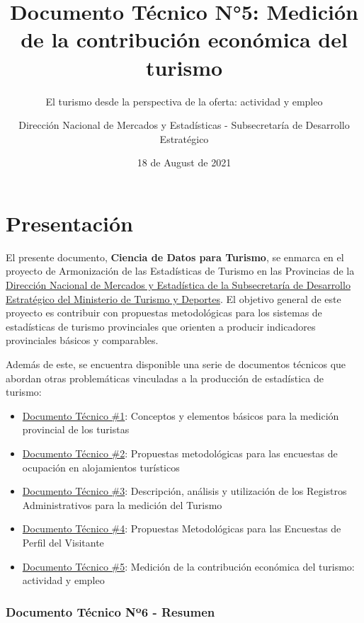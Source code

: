 \documentclass[
  openany]{book}
\title{Documento Técnico N°5: Medición de la contribución económica del turismo}
\subtitle{El turismo desde la perspectiva de la oferta: actividad y empleo}
\author{Dirección Nacional de Mercados y Estadísticas - Subsecretaría de Desarrollo Estratégico}
\date{18 de August de 2021}
\let\oldmaketitle\maketitle
\begin{document}
\maketitle


\newpage

\let\maketitle\oldmaketitle
\maketitle

{
\setcounter{tocdepth}{1}
\tableofcontents
}
\hypertarget{presentaciuxf3n}{%
\chapter*{Presentación}\label{presentaciuxf3n}}

El presente documento, \textbf{Ciencia de Datos para Turismo}, se enmarca en el proyecto de Armonización de las Estadísticas de Turismo en las Provincias de la \href{https://www.yvera.tur.ar/estadistica/}{Dirección Nacional de Mercados y Estadística de la Subsecretaría de Desarrollo Estratégico del Ministerio de Turismo y Deportes}. El objetivo general de este proyecto es contribuir con propuestas metodológicas para los sistemas de estadísticas de turismo provinciales que orienten a producir indicadores provinciales básicos y comparables.

Además de este, se encuentra disponible una serie de documentos técnicos que abordan otras problemáticas vinculadas a la producción de estadística de turismo:

\begin{itemize}
\item
  \href{https://dnme-minturdep.github.io/DT1_medicion_turismo/}{Documento Técnico \#1}: Conceptos y elementos básicos para la medición provincial de los turistas
\item
  \href{https://dnme-minturdep.github.io/DT2_encuestas/}{Documento Técnico \#2}: Propuestas metodológicas para las encuestas de ocupación en alojamientos turísticos
\item
  \href{https://dnme-minturdep.github.io/DT3_registros_adminsitrativos/}{Documento Técnico \#3}: Descripción, análisis y utilización de los Registros Administrativos para la medición del Turismo
\item
  \href{https://dnme-minturdep.github.io/DT4_perfiles/}{Documento Técnico \#4}: Propuestas Metodológicas para las Encuestas de Perfil del Visitante
\item
  \href{https://dnme-minturdep.github.io/DT5_actividad_empleo/}{Documento Técnico \#5}: Medición de la contribución económica del turismo: actividad y empleo
\end{itemize}

\hypertarget{documento-tuxe9cnico-nuxba6---resumen}{%
\subsection*{Documento Técnico Nº6 - Resumen}\label{documento-tuxe9cnico-nuxba6---resumen}}
\end{document}
